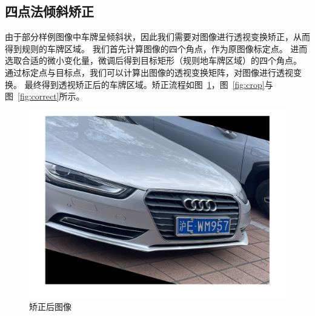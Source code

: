 \documentclass[utf8,a4paper]{ctexart}
\begin{document}
\subsection{四点法倾斜矫正}
由于部分样例图像中车牌呈倾斜状，因此我们需要对图像进行透视变换矫正，从而得到规则的车牌区域。
我们首先计算图像的四个角点，作为原图像标定点。
进而选取合适的微小变化量，微调后得到目标矩形（规则地车牌区域）的四个角点。
通过标定点与目标点，我们可以计算出图像的透视变换矩阵，对图像进行透视变换。
最终得到透视矫正后的车牌区域。矫正流程如图~\ref{fig:perspective}，图~\ref{fig:crop}与图~\ref{fig:correct}所示。

\begin{figure}[H]
    \center
    \includegraphics[width=.6\textwidth]{./img/difficult/矫正.png}
    \caption{矫正后图像}
    \label{fig:perspective}
\end{figure}
\end{document}
